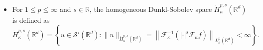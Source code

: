 \documentclass[a4paper,11pt, reqno]{amsart}
\theoremstyle{definition}
\theoremstyle{remark}
\numberwithin{equation}{section}
\begin{document}
\begin{itemize}
		\item For $1\leq p\leq \infty$ and $s\in\mathbb{R}$, the homogeneous Dunkl-Sobolev space $\dot{H}_\kappa^{p,s}\left(\mathbb{R}^{d}\right)$ is defined as $$\dot{H}_\kappa^{p,s}\left(\mathbb{R}^{d}\right)=\left\{u \in \mathcal{S}'\left(\mathbb{R}^{d}\right):   	\|u\|_{\dot{H}_\kappa^{p,s}\left(\mathbb{R}^{d}\right)}=\left\|\mathcal{F}^{-1}_\kappa\left(|\cdot|^s \mathcal{F}_\kappa f\right)\right\|_{L_\kappa^p\left(\mathbb{R}^{d}\right)}<\infty\right \}.$$
	\end{itemize}

 	
	
\end{document}
